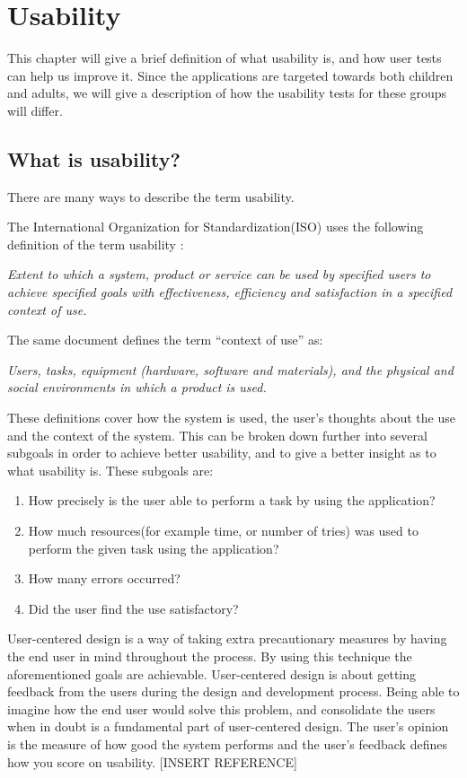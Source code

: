\chapter{Usability}
\label{chp:usability}

This chapter will give a brief definition of what usability is, and how user tests can help us improve it. Since the applications are targeted towards both children and adults, we will give a description of how the usability tests for these groups will differ.

\section{What is usability?}
\label{sec:usability}
There are many ways to describe the term usability. 

The International Organization for Standardization(ISO) uses the following definition of the term usability \cite{isousability}:

\textit{Extent to which a system, product or service can be used by specified
users to achieve specified goals with effectiveness, efficiency
and satisfaction in a specified context of use.}

The same document defines the term ``context of use'' as:

\textit{Users, tasks, equipment (hardware, software and materials), and
the physical and social environments in which a product is used.}

These definitions cover how the system is used, the user's thoughts about the use and the context of the system. This can be broken down further into several subgoals in order to achieve better usability, and to give a better insight as to what usability is. 
These subgoals are:

\begin{enumerate}
\item{How precisely is the user able to perform a task by using the application?}
\item{How much resources(for example time, or number of tries) was used to perform the given task using the application?}
\item{How many errors occurred?}
\item{Did the user find the use satisfactory?}
\end{enumerate}

User-centered design is a way of taking extra precautionary measures by having the end user in mind throughout the process. By using this technique the aforementioned goals are achievable. User-centered design is about getting feedback from the users during the design and development process. Being able to imagine how the end user would solve this problem, and consolidate the users when in doubt is a fundamental part of user-centered design. The user's opinion is the measure of how good the system performs and the user's feedback defines how you score on usability. [INSERT REFERENCE]

